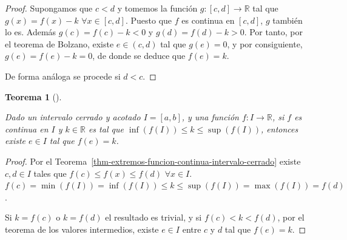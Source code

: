 \documentclass[
  a4paper,
]{scrreport}
\theoremstyle{definition}
\theoremstyle{plain}
\theoremstyle{definition}
\theoremstyle{definition}
\theoremstyle{plain}
\newtheorem{theorem}{Teorema}[chapter]
\theoremstyle{plain}
\theoremstyle{remark}
\begin{document}
\begin{tcolorbox}[enhanced jigsaw, leftrule=.75mm, colbacktitle=quarto-callout-note-color!10!white, toprule=.15mm, opacityback=0, opacitybacktitle=0.6, toptitle=1mm, breakable, bottomtitle=1mm, colframe=quarto-callout-note-color-frame, rightrule=.15mm, titlerule=0mm, title=\textcolor{quarto-callout-note-color}{\faInfo}\hspace{0.5em}{Demostración}, arc=.35mm, left=2mm, bottomrule=.15mm, colback=white, coltitle=black]

\begin{proof}
Supongamos que \(c<d\) y tomemos la función \(g:[c,d]\to\mathbb{R}\) tal
que \(g(x)=f(x)-k\) \(\forall x\in[c,d]\). Puesto que \(f\) es continua
en \([c,d]\), \(g\) también lo es. Además \(g(c)=f(c)-k<0\) y
\(g(d)=f(d)-k>0\). Por tanto, por el teorema de Bolzano, existe
\(e\in(c,d)\) tal que \(g(e)=0\), y por consiguiente, \(g(e)=f(e)-k=0\),
de donde se deduce que \(f(e)=k\).

De forma análoga se procede si \(d<c\).
\end{proof}

\end{tcolorbox}

\begin{theorem}[]\protect\hypertarget{thm-valores-intermedios}{}\label{thm-valores-intermedios}

Dado un intervalo cerrado y acotado \(I=[a,b]\), y una función
\(f:I\to\mathbb{R}\), si \(f\) es continua en \(I\) y \(k\in\mathbb{R}\)
es tal que \(\inf(f(I))\leq k\leq \sup(f(I))\), entonces existe
\(e\in I\) tal que \(f(e)=k\).

\end{theorem}

\begin{tcolorbox}[enhanced jigsaw, leftrule=.75mm, colbacktitle=quarto-callout-note-color!10!white, toprule=.15mm, opacityback=0, opacitybacktitle=0.6, toptitle=1mm, breakable, bottomtitle=1mm, colframe=quarto-callout-note-color-frame, rightrule=.15mm, titlerule=0mm, title=\textcolor{quarto-callout-note-color}{\faInfo}\hspace{0.5em}{Demostración}, arc=.35mm, left=2mm, bottomrule=.15mm, colback=white, coltitle=black]

\begin{proof}
Por el Teorema~\ref{thm-extremos-funcion-continua-intervalo-cerrado}
existe \(c,d\in I\) tales que \(f(c)\leq f(x)\leq f(d)\)
\(\forall x\in I\).
\(f(c)=\min(f(I))=\inf(f(I))\leq k\leq \sup(f(I))=\max(f(I))=f(d)\).

Si \(k=f(c)\) o \(k=f(d)\) el resultado es trivial, y si
\(f(c)<k<f(d)\), por el teorema de los valores intermedios, existe
\(e\in I\) entre \(c\) y \(d\) tal que \(f(e)=k\).
\end{proof}

\end{tcolorbox}
\end{document}

